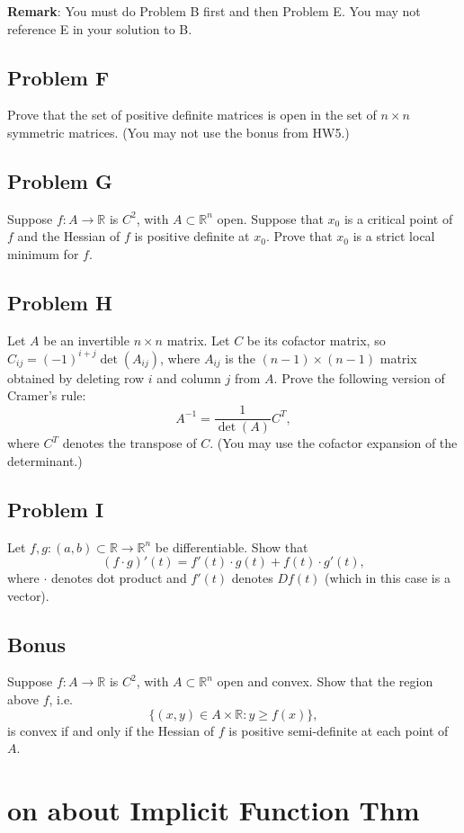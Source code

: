 \documentclass[lang=cn,11pt]{template}
\begin{document}
\textbf{Remark}: You must do Problem B first and then Problem E. You may not reference E in your solution to B.

\section*{Problem F}
Prove that the set of positive definite matrices is open in the set of $n \times n$ symmetric matrices. (You may not use the bonus from HW5.)

\section*{Problem G}
Suppose $f : A \to \mathbb{R}$ is $C^2$, with $A \subset \mathbb{R}^n$ open. Suppose that $x_0$ is a critical point of $f$ and the Hessian of $f$ is positive definite at $x_0$. Prove that $x_0$ is a strict local minimum for $f$.

\section*{Problem H}
Let $A$ be an invertible $n \times n$ matrix. Let $C$ be its cofactor matrix, so $C_{ij} = (-1)^{i+j} \det(A_{ij})$, where $A_{ij}$ is the $(n-1) \times (n-1)$ matrix obtained by deleting row $i$ and column $j$ from $A$. Prove the following version of Cramer's rule:
\[
A^{-1} = \frac{1}{\det(A)} C^T,
\]
where $C^T$ denotes the transpose of $C$. (You may use the cofactor expansion of the determinant.)

\section*{Problem I}
Let $f, g : (a, b) \subset \mathbb{R} \to \mathbb{R}^n$ be differentiable. Show that
\[
(f \cdot g)'(t) = f'(t) \cdot g(t) + f(t) \cdot g'(t),
\]
where $\cdot$ denotes dot product and $f'(t)$ denotes $Df(t)$ (which in this case is a vector).

\section*{Bonus}
Suppose $f : A \to \mathbb{R}$ is $C^2$, with $A \subset \mathbb{R}^n$ open and convex. Show that the region above $f$, i.e.
\[
\{(x, y) \in A \times \mathbb{R} : y \geq f(x)\},
\]
is convex if and only if the Hessian of $f$ is positive semi-definite at each point of $A$.




\chapter{on about Implicit Function Thm}
\end{document}

